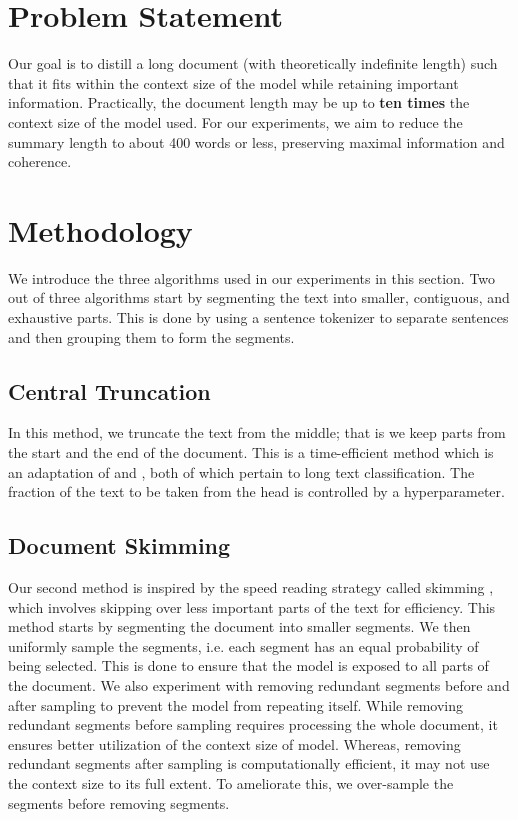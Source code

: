 \documentclass[letterpaper]{article} %
\begin{document}
\section{Problem Statement}

  Our goal is to distill a long document (with theoretically indefinite length) such
  that it fits within the context size of the model while retaining important information.
  Practically, the document length may be up to \textbf{ten times} the context size
  of the model used.
  For our experiments, we aim to reduce the summary length to about 400 words or less,
  preserving maximal information and coherence.


\section{Methodology}

  We introduce the three algorithms used in our experiments in this section.
  Two out of three algorithms start by segmenting the text into smaller, contiguous,
  and exhaustive parts.
  This is done by using a sentence tokenizer to separate sentences and then grouping
  them to form the segments.

  \subsection{Central Truncation}

    In this method, we truncate the text from the middle; that is we keep parts from the start
    and the end of the document.
    This is a time-efficient method which is an adaptation of \citet{worsham-kalita-2018-genre}
    and \citet{sun2019fine}, both of which pertain to long text classification.
    The fraction of the text to be taken from the head is controlled by a hyperparameter.

  \subsection{Document Skimming}

    Our second method is inspired by the speed reading strategy called skimming
    \cite{dhillon2020effect}, which involves skipping over less important parts of the text
    for efficiency.
    This method starts by segmenting the document into smaller segments.
    We then uniformly sample the segments, i.e. each segment has an equal probability
    of being selected.
    This is done to ensure that the model is exposed to all parts of the document.
    We also experiment with removing redundant segments before and after sampling to
    prevent the model from repeating itself.
    While removing redundant segments before sampling requires processing the whole
    document, it ensures better utilization of the context size of model.
    Whereas, removing redundant segments after sampling is computationally
    efficient, it may not use the context size to its full extent.
    To ameliorate this, we over-sample the segments before removing segments.
\end{document}
